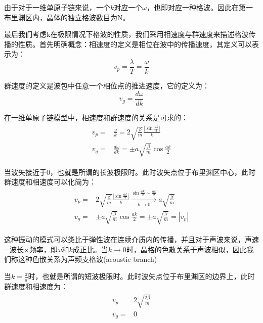 \documentclass{ctexart}
\begin{document}
            由于对于一维单原子链来说，一个$k$对应一个$\omega$，也即对应一种格波。因此在第一布里渊区内，晶体的独立格波数目为N。
            
            最后我们考虑k在极限情况下格波的性质，我们采用相速度与群速度来描述格波传播的性质。首先明确概念：相速度的定义是相位在波中的传播速度，其定义可以表示为：
            \begin{equation}
                v_p=\frac{\lambda}{T}=\frac{\omega}{k}
            \end{equation}
            
            群速度的定义是波包中任意一个相位点的推进速度，它的定义为：
            \begin{equation}
                v_g=\frac{d\omega}{dk}
            \end{equation}
            
            在一维单原子链模型中，相速度和群速度的关系是可求的：
            \begin{align}
                \begin{split}
                    v_p=&\frac{\omega}{k}=2\sqrt{\frac{\beta}{m}}\frac{|\sin{\frac{ak}{2}}|}{k}\\
                    v_g=&\frac{d\omega}{dk}=\pm a\sqrt{\frac{\beta}{m}}\cos{\frac{ak}{2}}
                \end{split}
            \end{align}
            
            当波矢接近于0，也就是所谓的长波极限时。此时波矢点位于布里渊区中心，此时群速度和相速度可以化简为：
            \begin{align}
                \begin{split}
                    v_p=&2\sqrt{\frac{\beta}{m}}\frac{|\sin{\frac{ak}{2}}|}{k}\xrightarrow[k\rightarrow 0]{\sin{\frac{ak}{2}}\sim \frac{ak}{2}} a\sqrt{\frac{\beta}{m}}\\
                    v_g=& \pm a\sqrt{\frac{\beta}{m}}\cos{\frac{ak}{2}} = \pm a\sqrt{\frac{\beta}{m}}=|v_p|
                \end{split}
            \end{align}
            
            这种振动的模式可以类比于弹性波在连续介质内的传播，并且对于声波来说，声速=波长$\times$频率，即$\omega$和$k$成正比。当$k\rightarrow 0$时，晶格的色散关系于声波相似，因此我们称这种色散关系为声频支格波(acoustic branch)
            
            当$k=\frac{\pi}{a}$时，也就是所谓的短波极限时。此时波矢点位于布里渊区的边界上，此时群速度和相速度为：
            \begin{align}
                \begin{split}
                    v_p=&2\sqrt{\frac{2\beta}{m}}\\
                    v_g=& 0
                \end{split}
            \end{align}
            
\end{document}
